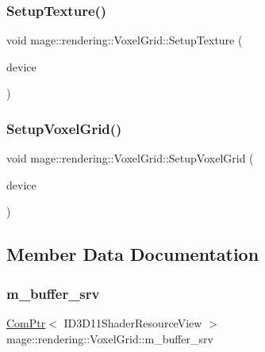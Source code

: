 \subsubsection{\texorpdfstring{Setup\+Texture()}{SetupTexture()}}
{\footnotesize\ttfamily void mage\+::rendering\+::\+Voxel\+Grid\+::\+Setup\+Texture (\begin{DoxyParamCaption}\item[{I\+D3\+D11\+Device \&}]{device }\end{DoxyParamCaption})\hspace{0.3cm}{\ttfamily [private]}}

\hypertarget{classmage_1_1rendering_1_1_voxel_grid_af7796e22a1a02c50c77b2c8d40d800c0}{}\label{classmage_1_1rendering_1_1_voxel_grid_af7796e22a1a02c50c77b2c8d40d800c0} 
\subsubsection{\texorpdfstring{Setup\+Voxel\+Grid()}{SetupVoxelGrid()}}
{\footnotesize\ttfamily void mage\+::rendering\+::\+Voxel\+Grid\+::\+Setup\+Voxel\+Grid (\begin{DoxyParamCaption}\item[{I\+D3\+D11\+Device \&}]{device }\end{DoxyParamCaption})\hspace{0.3cm}{\ttfamily [private]}}



\subsection{Member Data Documentation}
\hypertarget{classmage_1_1rendering_1_1_voxel_grid_ab0d154365336f1b8a9a0921cb4ade6a2}{}\label{classmage_1_1rendering_1_1_voxel_grid_ab0d154365336f1b8a9a0921cb4ade6a2} 
\subsubsection{\texorpdfstring{m\+\_\+buffer\+\_\+srv}{m\_buffer\_srv}}
{\footnotesize\ttfamily \hyperlink{namespacemage_ae74f374780900893caa5555d1031fd79}{Com\+Ptr}$<$ I\+D3\+D11\+Shader\+Resource\+View $>$ mage\+::rendering\+::\+Voxel\+Grid\+::m\+\_\+buffer\+\_\+srv\hspace{0.3cm}{\ttfamily [private]}}

